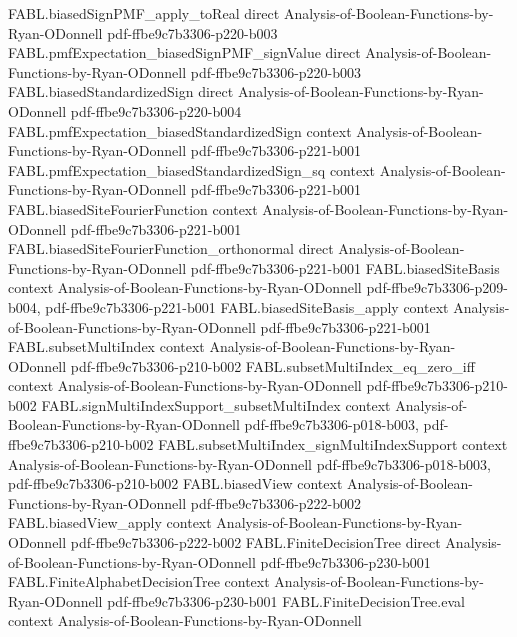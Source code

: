 \begin{theorem}
\proofstep
  {FABL.biasedSignPMF_apply_toReal}
  {direct}
  {Analysis-of-Boolean-Functions-by-Ryan-ODonnell}
  {pdf-ffbe9c7b3306-p220-b003}
\proofstep
  {FABL.pmfExpectation_biasedSignPMF_signValue}
  {direct}
  {Analysis-of-Boolean-Functions-by-Ryan-ODonnell}
  {pdf-ffbe9c7b3306-p220-b003}
\proofstep
  {FABL.biasedStandardizedSign}
  {direct}
  {Analysis-of-Boolean-Functions-by-Ryan-ODonnell}
  {pdf-ffbe9c7b3306-p220-b004}
\proofstep
  {FABL.pmfExpectation_biasedStandardizedSign}
  {context}
  {Analysis-of-Boolean-Functions-by-Ryan-ODonnell}
  {pdf-ffbe9c7b3306-p221-b001}
\proofstep
  {FABL.pmfExpectation_biasedStandardizedSign_sq}
  {context}
  {Analysis-of-Boolean-Functions-by-Ryan-ODonnell}
  {pdf-ffbe9c7b3306-p221-b001}
\proofstep
  {FABL.biasedSiteFourierFunction}
  {context}
  {Analysis-of-Boolean-Functions-by-Ryan-ODonnell}
  {pdf-ffbe9c7b3306-p221-b001}
\proofstep
  {FABL.biasedSiteFourierFunction_orthonormal}
  {direct}
  {Analysis-of-Boolean-Functions-by-Ryan-ODonnell}
  {pdf-ffbe9c7b3306-p221-b001}
\proofstep
  {FABL.biasedSiteBasis}
  {context}
  {Analysis-of-Boolean-Functions-by-Ryan-ODonnell}
  {pdf-ffbe9c7b3306-p209-b004,
    pdf-ffbe9c7b3306-p221-b001}
\proofstep
  {FABL.biasedSiteBasis_apply}
  {context}
  {Analysis-of-Boolean-Functions-by-Ryan-ODonnell}
  {pdf-ffbe9c7b3306-p221-b001}
\proofstep
  {FABL.subsetMultiIndex}
  {context}
  {Analysis-of-Boolean-Functions-by-Ryan-ODonnell}
  {pdf-ffbe9c7b3306-p210-b002}
\proofstep
  {FABL.subsetMultiIndex_eq_zero_iff}
  {context}
  {Analysis-of-Boolean-Functions-by-Ryan-ODonnell}
  {pdf-ffbe9c7b3306-p210-b002}
\proofstep
  {FABL.signMultiIndexSupport_subsetMultiIndex}
  {context}
  {Analysis-of-Boolean-Functions-by-Ryan-ODonnell}
  {pdf-ffbe9c7b3306-p018-b003,
    pdf-ffbe9c7b3306-p210-b002}
\proofstep
  {FABL.subsetMultiIndex_signMultiIndexSupport}
  {context}
  {Analysis-of-Boolean-Functions-by-Ryan-ODonnell}
  {pdf-ffbe9c7b3306-p018-b003,
    pdf-ffbe9c7b3306-p210-b002}
\proofstep
  {FABL.biasedView}
  {context}
  {Analysis-of-Boolean-Functions-by-Ryan-ODonnell}
  {pdf-ffbe9c7b3306-p222-b002}
\proofstep
  {FABL.biasedView_apply}
  {context}
  {Analysis-of-Boolean-Functions-by-Ryan-ODonnell}
  {pdf-ffbe9c7b3306-p222-b002}
\proofstep
  {FABL.FiniteDecisionTree}
  {direct}
  {Analysis-of-Boolean-Functions-by-Ryan-ODonnell}
  {pdf-ffbe9c7b3306-p230-b001}
\proofstep
  {FABL.FiniteAlphabetDecisionTree}
  {context}
  {Analysis-of-Boolean-Functions-by-Ryan-ODonnell}
  {pdf-ffbe9c7b3306-p230-b001}
\proofstep
  {FABL.FiniteDecisionTree.eval}
  {context}
  {Analysis-of-Boolean-Functions-by-Ryan-ODonnell}

\end{theorem}
